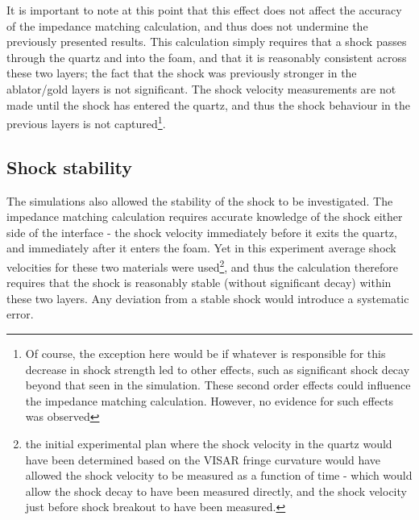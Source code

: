 It is important to note at this point that this effect does not affect the accuracy of the impedance matching calculation, and thus does not undermine the previously presented results. This calculation simply requires that a shock passes through the quartz and into the foam, and that it is reasonably consistent across these two layers; the fact that the shock was previously stronger in the ablator/gold layers is not significant. The shock velocity measurements are not made until the shock has entered the quartz, and thus the shock behaviour in the previous layers is not captured\footnote{Of course, the exception here would be if whatever is responsible for this decrease in shock strength led to other effects, such as significant shock decay beyond that seen in the simulation. These second order effects could influence the impedance matching calculation. However, no evidence for such effects was observed}.

\subsection{Shock stability}

The simulations also allowed the stability of the shock to be investigated. The impedance matching calculation requires accurate knowledge of the shock either side of the interface - the shock velocity immediately before it exits the quartz, and immediately after it enters the foam. Yet in this experiment average shock velocities for these two materials were used\footnote{the initial experimental plan where the shock velocity in the quartz would have been determined based on the VISAR fringe curvature would have allowed the shock velocity to be measured as a function of time - which would allow the shock decay to have been measured directly, and the shock velocity just before shock breakout to have been measured.}, and thus the calculation therefore requires that the shock is reasonably stable (without significant decay) within these two layers. Any deviation from a stable shock would introduce a systematic error.

